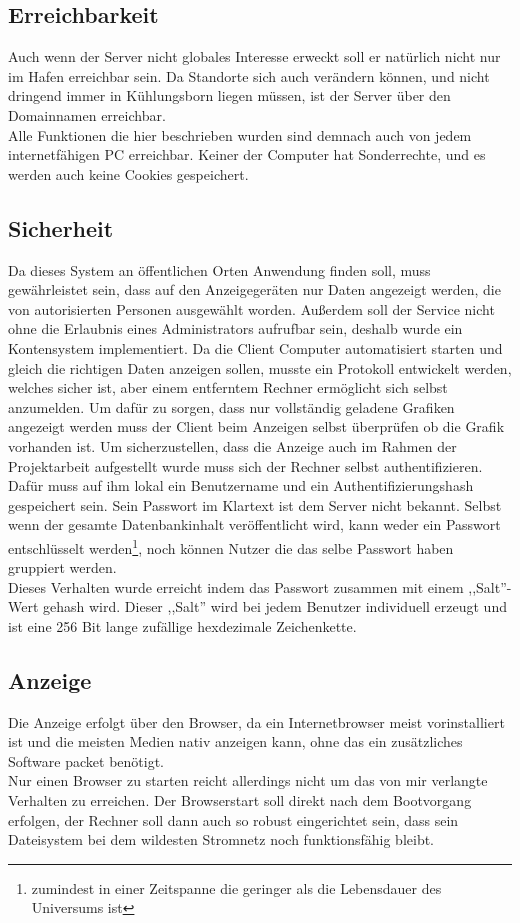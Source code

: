 \subsection{Erreichbarkeit} %
Auch wenn der Server nicht globales Interesse erweckt soll er natürlich nicht nur im Hafen erreichbar sein.
Da Standorte sich auch verändern können,
und nicht dringend immer in Kühlungsborn liegen müssen, ist der Server über den Domainnamen  erreichbar. \\
Alle Funktionen die hier beschrieben wurden sind demnach auch von jedem internetfähigen PC erreichbar. Keiner der Computer hat Sonderrechte,
und es werden auch keine Cookies gespeichert.

\subsection{Sicherheit} %
Da dieses System an öffentlichen Orten Anwendung finden soll,
muss gewährleistet sein, dass auf den Anzeigegeräten nur Daten angezeigt werden,
die von autorisierten Personen ausgewählt worden.
Außerdem soll der Service nicht ohne die Erlaubnis eines Administrators aufrufbar sein,
deshalb wurde ein Kontensystem implementiert.
Da die Client Computer automatisiert starten und gleich die richtigen Daten anzeigen sollen,
musste ein Protokoll entwickelt werden, welches sicher ist,
aber einem entferntem Rechner ermöglicht sich selbst anzumelden.
Um dafür zu sorgen, dass nur vollständig geladene Grafiken angezeigt werden muss
der Client beim Anzeigen selbst überprüfen ob die Grafik vorhanden ist.
Um sicherzustellen, dass die Anzeige auch im Rahmen der Projektarbeit aufgestellt
wurde muss sich der Rechner selbst authentifizieren.
Dafür muss auf ihm lokal ein Benutzername und ein
Authentifizierungshash gespeichert sein. Sein Passwort im Klartext ist dem Server nicht bekannt.
Selbst wenn der gesamte Datenbankinhalt veröffentlicht wird, kann weder ein Passwort
entschlüsselt werden\footnote{zumindest in einer Zeitspanne die
geringer als die Lebensdauer des Universums ist}, noch können Nutzer die das selbe Passwort haben
gruppiert werden.\\
Dieses Verhalten wurde erreicht indem das Passwort zusammen mit einem ,,Salt''-Wert gehash wird.
Dieser ,,Salt'' wird bei jedem Benutzer individuell
erzeugt und ist eine 256 Bit lange zufällige hexdezimale Zeichenkette.

\subsection{Anzeige}
Die Anzeige erfolgt über den Browser, da ein Internetbrowser meist vorinstalliert ist
und die meisten Medien nativ anzeigen kann, ohne das ein zusätzliches Software packet
benötigt. \\
Nur einen Browser zu starten reicht allerdings nicht um das von mir verlangte Verhalten
zu erreichen. Der Browserstart soll direkt nach dem Bootvorgang erfolgen, der Rechner soll
dann auch so robust eingerichtet sein, dass sein Dateisystem bei dem wildesten Stromnetz
noch funktionsfähig bleibt.
